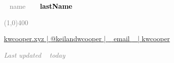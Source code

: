 \documentclass[9pt]{result/developercv} %
\begin{document}

	
	

\begin{center}
\HUGE\textcolor{gray}{~{{ name }}~}
\HUGE\textcolor{black}{\textbf{~{{ lastName }}~}}
\end{center}

\begin{center}
\textcolor{gray}{\line(1,0){400}}
\end{center}

\begin{center}
\href{https://kwcooper.xyz}{\faGlobe \hspace{0.1cm} kwcooper.xyz | \hspace{0.1cm}}
\href{https://twitter.com/kwcooper}{\faTwitter \hspace{0.1cm} @keilandwcooper | \hspace{0.1cm}} 
\href{mailto: ~{{ email }}~ }{\faAt \hspace{0.1cm} ~{{ email }}~ | \hspace{0.1cm}} 
\href{https://github.com/kwcooper}{\faGithub \hspace{0.1cm} kwcooper} 
\end{center}

\begin{center} \emph{\textcolor{gray}{Last updated ~{{ today }}~}} \end{center}
\vspace{0.7cm}
\end{document}
